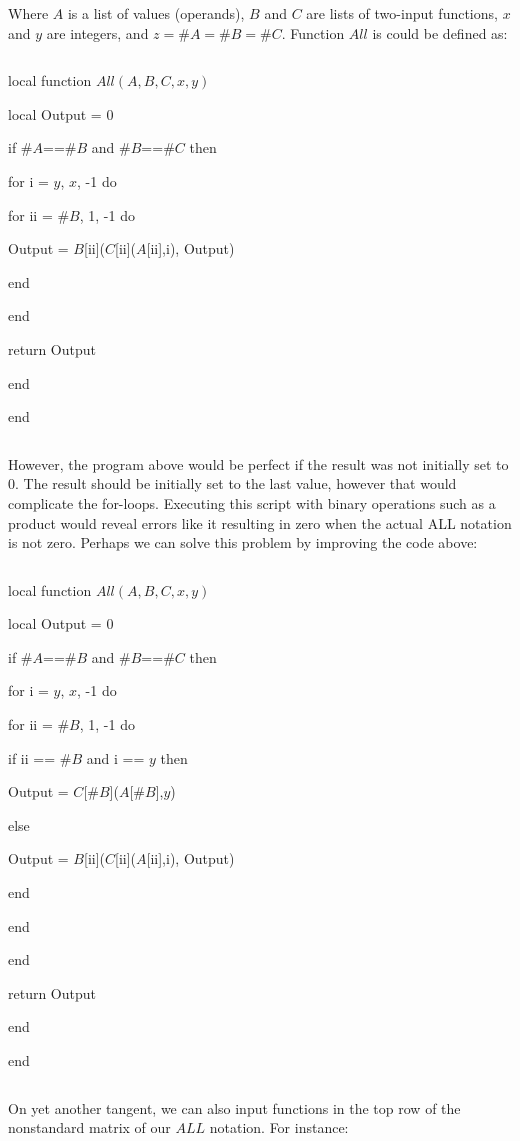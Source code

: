 \documentclass{article}
\begin{document}
Where $A$ is a list of values (operands), $B$ and $C$ are lists of two-input functions, $x$ and $y$ are integers, and $z = \# A = \# B = \# C$. Function $All$ is could be defined as:

$${}$$

local function $All(A, B, C, x, y)$

local Output = 0

if $\#A$==$\#B$ and $\#B$==$\#C$ then

for i = $y$, $x$, -1 do

for ii = $\#B$, 1, -1 do

Output = $B$[ii]($C$[ii]($A$[ii],i), Output)

end

end

return Output

end

end

$${}$$

However, the program above would be perfect if the result was not initially set to 0. The result should be initially set to the last value, however that would complicate the for-loops. Executing this script with binary operations such as a product would reveal errors like it resulting in zero when the actual ALL notation is not zero. Perhaps we can solve this problem by improving the code above:

$${}$$

local function $All(A, B, C, x, y)$

local Output = 0

if $\#A$==$\#B$ and $\#B$==$\#C$ then

for i = $y$, $x$, -1 do

for ii = $\#B$, 1, -1 do

if ii == $\#B$ and i == $y$ then

Output = $C$[$\#B$]($A$[$\#B$],$y$)

else

Output = $B$[ii]($C$[ii]($A$[ii],i), Output)

end

end

end

return Output

end

end

$${}$$

 On yet another tangent, we can also input functions in the top row of the nonstandard matrix of our $ALL$ notation. For instance:
\end{document}
